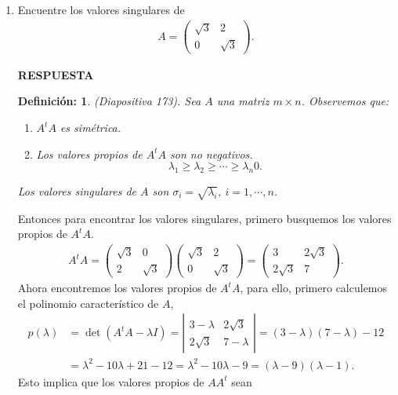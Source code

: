 \documentclass[11pt,letterpaper]{article}
\newcommand{\res}{\textbf{RESPUESTA}\\}
\newtheorem{thmd}{Definición:}
\begin{document}
\begin{enumerate}
\item Encuentre los valores singulares de 
\begin{align*}
A=\begin{pmatrix}
\sqrt{3} & 2\\
0 & \sqrt{3}
\end{pmatrix}.
\end{align*}

\res \begin{framed}
    \begin{thmd} \label{d_valores_singulares}
	(Diapositiva 173). Sea $A$ una matriz $m\times n$. Observemos que:
	\begin{enumerate}
	\item $A^tA$ es simétrica.
	\item Los valores propios de $A^tA$ son no negativos.
	$$\lambda_1\geq \lambda_2 \geq \cdots \geq \lambda_n 0.$$
\end{enumerate}	 Los valores singulares de $A$ son $\sigma_i=\sqrt{\lambda_i}, \ i=1,\cdots, n$.
	    \end{thmd}
\end{framed}
Entonces para encontrar los valores singulares, primero busquemos los valores propios de $A^tA$. 
\begin{align*}
A^tA =\begin{pmatrix}
\sqrt{3} & 0\\
2 & \sqrt{3}
\end{pmatrix} \begin{pmatrix}
\sqrt{3} & 2\\
0 & \sqrt{3}
\end{pmatrix}= \begin{pmatrix}
3 & 2\sqrt{3}\\
2\sqrt{3} & 7
\end{pmatrix}.
\end{align*}
Ahora encontremos los valores propios de $A^tA$, para ello, primero calculemos el polinomio característico de $A$,
\begin{align*}
p(\lambda) &= \det (A^tA-\lambda I)=
\left|\begin{array}{ccc}
3-\lambda & 2\sqrt{3}\\
2\sqrt{3} & 7-\lambda
\end{array} \right|=(3-\lambda)(7-\lambda)-12\\
&=\lambda^2-10\lambda+21-12= \lambda^2-10\lambda-9=(\lambda-9)(\lambda-1).
\end{align*}
Esto implica que los valores propios de $AA^t$ sean
\begin{align*}

\end{align*}
\end{enumerate}
\end{document}
